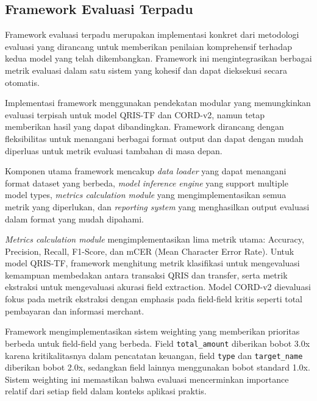 \subsection{Framework Evaluasi Terpadu}
\label{subsec:framework-evaluasi-terpadu}

Framework evaluasi terpadu merupakan implementasi konkret dari metodologi evaluasi yang dirancang untuk memberikan penilaian komprehensif terhadap kedua model yang telah dikembangkan. Framework ini mengintegrasikan berbagai metrik evaluasi dalam satu sistem yang kohesif dan dapat dieksekusi secara otomatis.


Implementasi framework menggunakan pendekatan modular yang memungkinkan evaluasi terpisah untuk model QRIS-TF dan CORD-v2, namun tetap memberikan hasil yang dapat dibandingkan. Framework dirancang dengan fleksibilitas untuk menangani berbagai format output dan dapat dengan mudah diperluas untuk metrik evaluasi tambahan di masa depan.

Komponen utama framework mencakup \emph{data loader} yang dapat menangani format dataset yang berbeda, \emph{model inference engine} yang support multiple model types, \emph{metrics calculation module} yang mengimplementasikan semua metrik yang diperlukan, dan \emph{reporting system} yang menghasilkan output evaluasi dalam format yang mudah dipahami.

\emph{Metrics calculation module} mengimplementasikan lima metrik utama: Accuracy, Precision, Recall, F1-Score, dan mCER (Mean Character Error Rate). Untuk model QRIS-TF, framework menghitung metrik klasifikasi untuk mengevaluasi kemampuan membedakan antara transaksi QRIS dan transfer, serta metrik ekstraksi untuk mengevaluasi akurasi field extraction. Model CORD-v2 dievaluasi fokus pada metrik ekstraksi dengan emphasis pada field-field kritis seperti total pembayaran dan informasi merchant.

Framework mengimplementasikan sistem weighting yang memberikan prioritas berbeda untuk field-field yang berbeda. Field \texttt{total\_amount} diberikan bobot 3.0x karena kritikalitasnya dalam pencatatan keuangan, field \texttt{type} dan \texttt{target\_name} diberikan bobot 2.0x, sedangkan field lainnya menggunakan bobot standard 1.0x. Sistem weighting ini memastikan bahwa evaluasi mencerminkan importance relatif dari setiap field dalam konteks aplikasi praktis.

